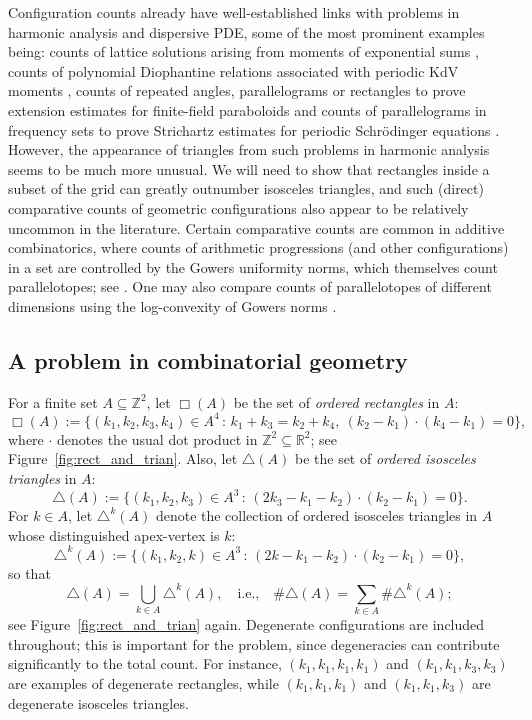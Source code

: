 \documentclass[10pt,a4paper]{amsart}
\numberwithin{equation}{section}
\begin{document}
Configuration counts already have well-established links with problems in harmonic analysis and dispersive PDE, some of the most prominent examples being: 
counts of lattice solutions arising from moments of exponential sums \cite{B1},
counts of polynomial Diophantine relations associated with periodic KdV moments \cite{B2},
counts of repeated angles, parallelograms or rectangles to prove extension estimates for finite-field paraboloids \cite{RS18,IKL20,Lew20}
and counts of parallelograms in frequency sets to prove Strichartz estimates for periodic Schr\"{o}dinger equations \cite{HK,LZ25}. However, the appearance of triangles from such problems in harmonic analysis seems to be much more unusual.
We will need to show that rectangles inside a subset of the grid can greatly outnumber isosceles triangles, and such (direct) comparative counts of geometric configurations also appear to be relatively uncommon in the literature. Certain comparative counts are common in additive combinatorics, where counts of arithmetic progressions (and other configurations) in a set are controlled by the Gowers uniformity norms, which themselves count parallelotopes; see \cite{TV, THOFA}. One may also
compare counts of parallelotopes of different dimensions using the log-convexity of Gowers norms \cite{Shk14,Man17,BT24}.

\subsection{A problem in combinatorial geometry}
For a finite set $A\subseteq\mathbb{Z}^2$, let $\Box(A)$ be the set of \emph{ordered rectangles} in $A$:
\[ \Box(A) := \{(k_1,k_2,k_3,k_4)\in A^4 \,:\, k_1+k_3=k_2+k_4,\ (k_2-k_1)\cdot(k_4-k_1)=0 \}, \]
where $\cdot$ denotes the usual dot product in $\mathbb{Z}^2\subseteq\mathbb{R}^2$; see Figure~\ref{fig:rect_and_trian}.
Also, let $\triangle(A)$ be the set of \emph{ordered isosceles triangles} in $A$:
\[ \triangle(A) := \{(k_1,k_2,k_3)\in A^3 \,:\, (2k_3-k_1-k_2)\cdot(k_2-k_1)=0\}. \]
For $k\in A$, let $\triangle^k(A)$ denote the collection of ordered isosceles triangles in $A$ whose distinguished apex-vertex is $k$:
\[ \triangle^k(A) := \{(k_1,k_2,k)\in A^3 \,:\, (2k-k_1-k_2)\cdot(k_2-k_1)=0\}, \]
so that
\[ \triangle(A) = \bigcup_{k\in A} \triangle^k(A),\quad \text{i.e.,}\quad \#\triangle(A) = \sum_{k\in A} \#\triangle^k(A); \]
see Figure~\ref{fig:rect_and_trian} again.
Degenerate configurations are included throughout; this is important for the problem, since degeneracies can contribute significantly to the total count. For instance, $(k_1,k_1,k_1,k_1)$ and $(k_1,k_1,k_3,k_3)$ are examples of degenerate rectangles, while $(k_1,k_1,k_1)$ and $(k_1,k_1,k_3)$ are degenerate isosceles triangles.
\end{document}
